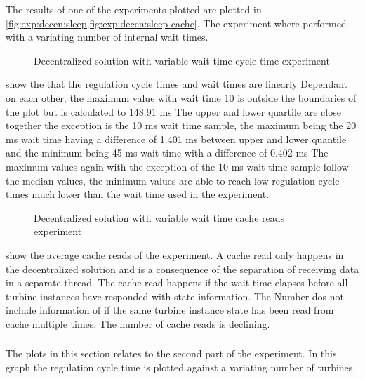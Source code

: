 The results of one of the  experiments plotted are plotted in \cref{fig:exp:decen:sleep,fig:exp:decen:sleep-cache}.
The experiment where performed with a variating number of internal wait times.

\begin{figure}[h!]
	\centering
	
	\caption{Decentralized solution with variable wait time cycle time experiment}
	\label{fig:exp:decen:sleep}
\end{figure}

 show the that the regulation cycle times and wait times are linearly Dependant on each other, the maximum value with wait time 10 is outside the boundaries of the plot but is calculated to 148.91 ms The upper and lower quartile are close together the exception is the 10 ms wait time sample, the maximum being the 20 ms wait time having a difference of 1.401 ms between upper and lower quantile and the minimum being 45 ms wait time with a difference of 0.402 ms The maximum values again with the exception of the 10 ms wait time sample follow the median values, the minimum values are able to reach low regulation cycle times much lower than the wait time used in the experiment.

\begin{figure}[h!]
	\centering
	
	\caption{Decentralized solution with variable wait time cache reads experiment}
	\label{fig:exp:decen:sleep-cache}
\end{figure}

 show the average cache reads of the experiment.
A cache read only happens in the decentralized solution and is a consequence of the separation of receiving data in a separate thread.
The cache read happens if the wait time elapses before all turbine instances have responded with state information. The Number dos not include information of if the same turbine instance state has been read from cache multiple times.
The number of cache reads is declining. 

\clearpage
\subsubsection{}
The plots in this section relates to the second part of the  experiment. In this graph the regulation cycle time is plotted against a variating number of turbines.

